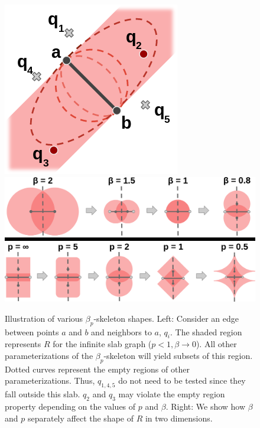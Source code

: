 \begin{figure}[!t]
    \includegraphics[width=0.34\linewidth]{figs/chap7/infinite_slab.png}
    \includegraphics[width=0.64\linewidth]{figs/chap7/variable_parameters.png}
    \caption[Illustration of various $\beta_p$-skeleton shapes]{Illustration of various $\beta_p$-skeleton shapes. Left: Consider an edge between points $a$ and $b$ and neighbors to $a$, $q_{i}$.
    The shaded region represents $R$ for the infinite slab graph ($p < 1, \beta \rightarrow 0$).
    All other parameterizations of the $\beta_p$-skeleton will yield subsets of this region.
    Dotted curves represent the empty regions of other parameterizations.
    Thus, $q_{1,4,5}$ do not need to be tested since they fall outside this slab.
    $q_2$ and $q_3$ may violate the empty region property depending on the values of $p$ and $\beta$.
    Right: We show how $\beta$ and $p$ separately affect the shape of $R$ in two dimensions.}
    \label{fig:infinite_slab}
\end{figure}

